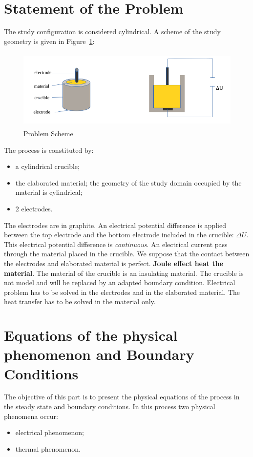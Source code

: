 \section{Statement of the Problem}
The study configuration is considered cylindrical. A scheme of the study geometry is given in Figure~\ref{figure:problem}:
\begin{figure}
	\centering
	\includegraphics[height=4cm]{Images/problem.png}
	\caption{Problem Scheme}
	\label{figure:problem}
\end{figure}
The process is constituted by:
\begin{itemize}
	\item a cylindrical crucible;
	\item the elaborated material; the geometry of the study domain occupied by the material is cylindrical;
	\item 2 electrodes.
\end{itemize}

The electrodes are in graphite. An electrical potential difference is applied between the top electrode and the bottom electrode included in the crucible: $ \Delta U $. This electrical potential difference is \emph{continuous}. An electrical current pass through the material placed in the crucible. We suppose that the contact between the electrodes and elaborated material is perfect. \textbf{Joule effect heat the material}. The material of the crucible is an insulating material. The crucible is not model and will be replaced by an adapted boundary condition. Electrical problem has to be solved in the electrodes and in the elaborated material. The heat transfer has to be solved in the material only.

\section{Equations of the physical phenomenon and Boundary Conditions}
The objective of this part is to present the physical equations of the process in the steady state and boundary conditions. In this process two physical phenomena occur:
\begin{itemize}
	\item electrical phenomenon;
	\item thermal phenomenon.
\end{itemize}
